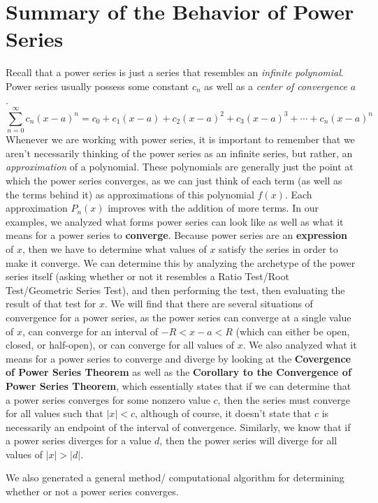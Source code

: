 \section{Summary of the Behavior of Power Series}
Recall that a power series is just a series that
resembles an \textit{infinite polynomial}. Power
series usually possess some constant $ c_{n}$ as well
as a \textit{center of convergence} $ a $.
\[ \sum_{n=0}^{\infty} c_{n}(x-a)^{n} =
  c_{0} + c_{1}(x-a) + c_{2}(x-a)^{2} + c_{3}(x-a)^{3} + \cdots
+ c_{n}(x-a)^{n}\]
Whenever we are working with power series, it is
important to remember that we aren't necessarily
thinking of the power series as an infinite series,
but rather, an \textit{approximation} of a polynomial.
These polynomials are generally just the point at
which the power series converges, as we can just think of
each term (as well as the terms behind it) as approximations
of this polynomial $ f(x)$. Each approximation $ P_{n}(x)$ improves
with the addition of more terms.
In our examples, we analyzed what forms power series can look
like as well as what it means for a power series to \textbf{converge}. Because power series are an
\textbf{expression} of $ x $, then we have to determine
what values of $ x $ satisfy the series in order to make it
converge. We can determine this by analyzing the archetype
of the power series itself (asking whether or not
it resembles a Ratio Test/Root Test/Geometric Series Test),
and then performing the test, then evaluating the result
of that test for $ x $. We will find that there are
several situations of convergence for a power series,
as the power series can converge at a single value of $ x $,
can converge for an interval of $ -R < x - a < R $ (which
can either be open, closed, or half-open), or can converge
for all values of $ x $. We also analyzed what it means
for a power series to converge and diverge by looking at the
\textbf{Covergence of Power Series Theorem} as well as the
\textbf{Corollary to the Convergence of Power Series Theorem},
which essentially states that if we can determine that a
power series converges for some nonzero value $ c $, then
the series must converge for all values such that $ | x | < c $,
although of course, it doesn't state that $ c $ is necessarily
an endpoint of the interval of convergence. Similarly, we
know that if a power series diverges for a value $ d $, then
the power series will diverge for all values of $ | x | > | d | $.
\par We also generated a general method/ computational algorithm
for determining whether or not a power series converges.
